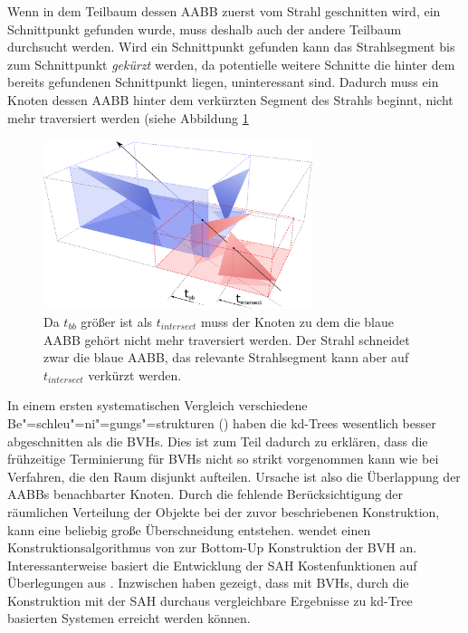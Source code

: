 Wenn in dem Teilbaum dessen AABB zuerst vom Strahl geschnitten wird, ein Schnittpunkt gefunden wurde, muss deshalb auch der andere Teilbaum durchsucht werden.
Wird ein Schnittpunkt gefunden kann das Strahlsegment bis zum Schnittpunkt \textit{gekürzt} werden, da potentielle weitere Schnitte die hinter dem bereits gefundenen Schnittpunkt liegen, uninteressant sind. Dadurch muss ein Knoten dessen AABB hinter dem verkürzten Segment des Strahls beginnt, nicht mehr traversiert werden (siehe Abbildung \ref{fig:bvhearlyexit}

\begin{figure}\centering
\includegraphics[width=0.7\textwidth]{images/bvhearlyexit.pdf} 
\caption[Begrenzung der Traversierung durch Verkürzen des Strahlsegments]{Da $t_{bb}$ größer ist als $t_{intersect}$ muss der Knoten zu dem die blaue AABB gehört nicht mehr traversiert werden. Der Strahl schneidet zwar die blaue AABB, das relevante Strahlsegment kann aber auf $t_{intersect}$ verkürzt werden.}
\label{fig:bvhearlyexit}
\end{figure}

In einem ersten systematischen Vergleich verschiedene Be"=schleu"=ni"=gungs"=strukturen (\cite{Havran00}) haben die kd-Trees wesentlich besser abgeschnitten als die BVHs. Dies ist zum Teil dadurch zu erklären, dass die frühzeitige Terminierung für BVHs nicht so strikt vorgenommen kann wie bei Verfahren, die den Raum disjunkt aufteilen. Ursache ist also die Überlappung der AABBs benachbarter Knoten.
Durch die fehlende Berücksichtigung der räumlichen Verteilung der Objekte bei der zuvor beschriebenen Konstruktion, kann eine beliebig große Überschneidung entstehen.
\cite{Havran00} wendet einen Konstruktionsalgorithmus von \cite{GoldsmithSalmon87} zur Bottom-Up Konstruktion der BVH an. Interessanterweise basiert die Entwicklung der SAH Kostenfunktionen auf Überlegungen aus \cite{GoldsmithSalmon87}.
Inzwischen haben \cite{WBS07} gezeigt, dass mit BVHs, durch die Konstruktion mit der SAH durchaus vergleichbare Ergebnisse zu kd-Tree basierten Systemen erreicht werden können.


